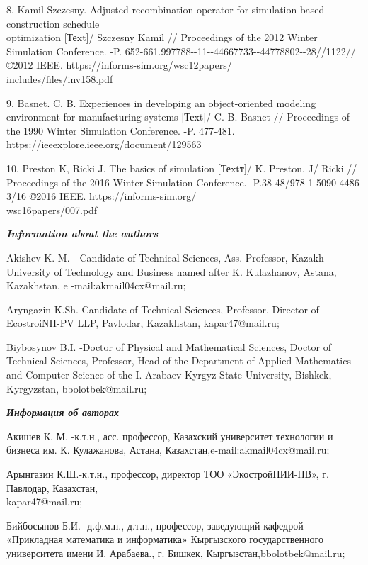 \begin{noparindent}
8. Kamil Szczesny. Adjusted recombination operator for simulation based
construction schedule \\optimization {[}Теxt{]}/ Szczesny Kamil //
Proceedings of the 2012 Winter Simulation Conference. -P.
652-661.997788-\/-11-\/-44667733-\/-44778802-\/-28//1122//©2012 IEEE.
https://informs-sim.org/wsc12papers/\\includes/files/inv158.pdf

9. Basnet. C. B. Experiences in developing an object-oriented modeling
environment for manufacturing systems {[}Теxt{]}/ C. B. Basnet //
Proceedings of the 1990 Winter Simulation Conference. -P. 477-481.
https://ieeexplore.ieee.org/document/129563

10. Preston K, Ricki J. The basics of simulation {[}Теxtт{]}/ K.
Preston, J/ Ricki // Proceedings of the 2016 Winter Simulation
Conference. -P.38-48/978-1-5090-4486-3/16 ©2016 IEEE.
https://informs-sim.org/\\wsc16papers/007.pdf
\end{noparindent}

\emph{{\bfseries Information about the authors}}
\begin{noparindent}

Akishev K. M. - Candidate of Technical Sciences, Ass. Professor, Kazakh
University of Technology and Business named after K. Kulazhanov, Astana,
Kazakhstan, e -mail:akmail04cx@mail.ru;

Aryngazin K.Sh.-Candidate of Technical Sciences, Professor, Director of
EcostroiNII-PV LLP, Pavlodar, Kazakhstan, kapar47@mail.ru;

Biybosynov B.I. -Doctor of Physical and Mathematical Sciences, Doctor
of Technical Sciences, Professor, Head of the Department of Applied
Mathematics and Computer Science of the I. Arabaev Kyrgyz State
University, Bishkek, Kyrgyzstan, bbolotbek@mail.ru;
\end{noparindent}

\emph{{\bfseries Информация об авторах}}
\begin{noparindent}

Акишев К. М. -к.т.н., асс. профессор, Казахский университет технологии и
бизнеса им. К. Кулажанова, Астана, Казахстан,e-mail:akmail04cx@mail.ru;

Арынгазин К.Ш.-к.т.н., профессор, директор ТОО «ЭкостройНИИ-ПВ», г.
Павлодар, Казахстан, \\kapar47@mail.ru;

Бийбосынов Б.И. -д.ф.м.н., д.т.н., профессор, заведующий кафедрой
«Прикладная математика и информатика» Кыргызского государственного
университета имени И. Арабаева., г. Бишкек, Кыргызстан,bbolotbek@mail.ru;
\end{noparindent}
